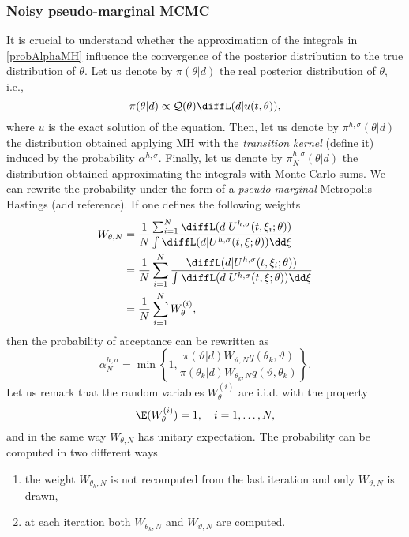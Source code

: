 \subsubsection{Noisy pseudo-marginal MCMC} \label{sect:MCWM}

It is crucial to understand whether the approximation of the integrals in \eqref{probAlphaMH} influence the convergence of the posterior distribution to the true distribution of $\theta$. Let us denote by $\pi(\theta|d)$ the real posterior distribution of $\theta$, i.e.,
\begin{equation}
	\pi(\theta|d) \propto \mathcal{Q}(\theta) \diffL(d|u(t,\theta)),
\end{equation}
where $u$ is the exact solution of the equation. Then, let us denote by $\pi^{h,\sigma}(\theta|d)$ the distribution obtained applying MH with the \textit{transition kernel} (define it) induced by the probability $\alpha^{h,\sigma}$. Finally, let us denote by $\pi^{h,\sigma}_N(\theta|d)$ the distribution obtained approximating the integrals with Monte Carlo sums. We can rewrite the probability under the form of a \textit{pseudo-marginal} Metropolis-Hastings (add reference). If one defines the following weights 
\begin{equation}
\begin{aligned}
	W_{\theta, N} &= \frac{1}{N} \frac{\sum_{i=1}^{N}\diffL(d|U^{h,\sigma}(t,\xi_i; \theta))}{\int{\diffL(d|U^{h,\sigma}(t,\xi; \theta))\dd\xi}} \\
			      &= \frac{1}{N} \sum_{i=1}^{N}\frac{\diffL(d|U^{h,\sigma}(t,\xi_i; \theta))}{\int{\diffL(d|U^{h,\sigma}(t,\xi; \theta))\dd\xi}} \\
			      &= \frac{1}{N} \sum_{i=1}^{N}W_\theta^{(i)},
\end{aligned}
\end{equation}
then the probability of acceptance can be rewritten as
\begin{equation}
	\alpha^{h,\sigma}_{N} = \min\left\{1, \frac{\pi(\vartheta|d)W_{\vartheta,N}q(\theta_k, \vartheta)}{\pi(\theta_k|d)W_{\theta_k,N}q(\vartheta,\theta_k)}\right\}.
\end{equation}
Let us remark that the random variables $W_\theta^{(i)}$ are i.i.d. with the property
\begin{equation}
	\E(W_\theta^{(i)}) = 1, \quad i = 1, \ldots, N,
\end{equation}
and in the same way $W_{\theta,N}$ has unitary expectation. The probability can be computed in two different ways
\begin{enumerate}
	\item the weight $W_{\theta_k,N}$ is not recomputed from the last iteration and only $W_{\vartheta,N}$ is drawn,
	\item at each iteration both $W_{\theta_k,N}$ and $W_{\vartheta,N}$ are computed.
\end{enumerate}
